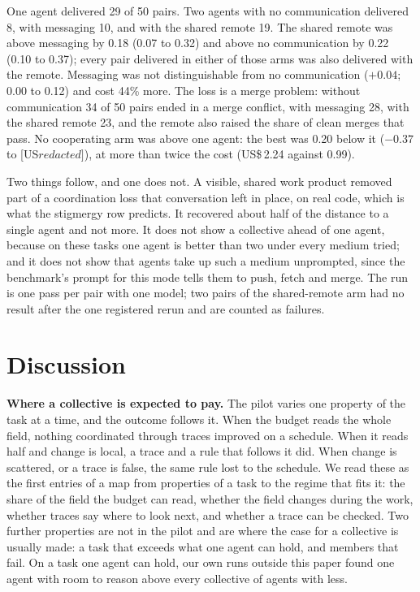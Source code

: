 \documentclass[10pt,twocolumn]{article}
\begin{document}
One agent delivered 29 of 50 pairs. Two agents with no communication delivered 8, with messaging 10, and with the shared remote 19. The shared remote was above messaging by 0.18 (0.07 to 0.32) and above no communication by 0.22 (0.10 to 0.37); every pair delivered in either of those arms was also delivered with the remote. Messaging was not distinguishable from no communication ($+0.04$; 0.00 to 0.12) and cost 44\% more. The loss is a merge problem: without communication 34 of 50 pairs ended in a merge conflict, with messaging 28, with the shared remote 23, and the remote also raised the share of clean merges that pass. No cooperating arm was above one agent: the best was 0.20 below it ($-0.37$ to [US$ redacted]$), at more than twice the cost (US\$\,2.24 against 0.99).

Two things follow, and one does not. A visible, shared work product removed part of a coordination loss that conversation left in place, on real code, which is what the stigmergy row predicts. It recovered about half of the distance to a single agent and not more. It does not show a collective ahead of one agent, because on these tasks one agent is better than two under every medium tried; and it does not show that agents take up such a medium unprompted, since the benchmark's prompt for this mode tells them to push, fetch and merge. The run is one pass per pair with one model; two pairs of the shared-remote arm had no result after the one registered rerun and are counted as failures.

\section{Discussion}

\textbf{Where a collective is expected to pay.} The pilot varies one property of the task at a time, and the outcome follows it. When the budget reads the whole field, nothing coordinated through traces improved on a schedule. When it reads half and change is local, a trace and a rule that follows it did. When change is scattered, or a trace is false, the same rule lost to the schedule. We read these as the first entries of a map from properties of a task to the regime that fits it: the share of the field the budget can read, whether the field changes during the work, whether traces say where to look next, and whether a trace can be checked. Two further properties are not in the pilot and are where the case for a collective is usually made: a task that exceeds what one agent can hold, and members that fail. On a task one agent can hold, our own runs outside this paper found one agent with room to reason above every collective of agents with less.
\end{document}
